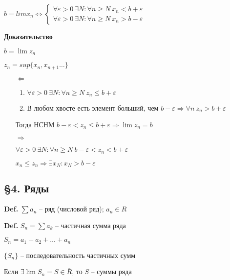 \documentclass[14pt, letter paper]{article}
\begin{document}
$b = \overline{lim}x_n \Leftrightarrow \begin{cases}
    \forall \varepsilon > 0\ \exists N : \forall n \geq N\ x_n < b + \varepsilon \\
    \forall \varepsilon > 0\ \exists N : \forall n \geq N\ x_n > b - \varepsilon
\end{cases}$

\begin{center}
    \textbf{Доказательство}
\end{center}

$b = \lim{z_n}$

$z_n = sup\{x_n, x_{n+1} \ldots\}$

\begin{itemize}
    \item[$\Leftarrow$] 

    \begin{enumerate}
        \item $\forall \varepsilon > 0\ \exists N : \forall n \geq N\ z_n \leq b + \varepsilon$
        \item В любом хвосте есть элемент больший, чем $b - \varepsilon \Rightarrow \forall n\ z_n > b + \varepsilon$
    \end{enumerate}

    Тогда НСНМ $b - \varepsilon < z_n \leq b + \varepsilon \Rightarrow \lim{z_n} = b$

    \item[$\Rightarrow$]

    $\forall \varepsilon > 0\ \exists N : \forall n \geq N\ b - \varepsilon < z_n < b + \varepsilon$

    $x_n \leq z_n \Rightarrow \exists x_N : x_N > b - \varepsilon$
\end{itemize}

\begin{center}
    \subsection*{\S 4. Ряды}
\end{center}

\textbf{Def.} $\sum a_n$ -- ряд (числовой ряд); $a_n \in R$

\textbf{Def.} $S_n = \sum a_k$ -- частичная сумма ряда

$S_n = a_1 + a_2 + \ldots + a_n$

$\{S_n\}$ -- последовательность частичных сумм

Если $\exists \lim{S_n} = S \in \overline{R}$, то $S$ -- суммы ряда
\end{document}

